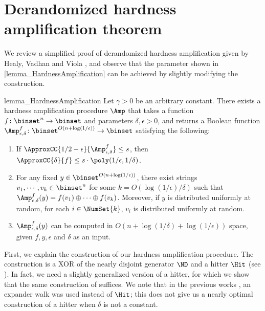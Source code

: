 \documentclass[11pt]{article}
\numberwithin{equation}{section}
\theoremstyle{definition}
\theoremstyle{plain}
\begin{document}
%
%
%
%
%
%
%
%
%
%
%
%
%
%
%
%
%
%
%
%
%
%
%
%
%
%
%
%
%
%
%
%
%
%
%
%

\appendix

\section{Derandomized hardness amplification theorem}
\label{section_HardnessAmplification}

We review a simplified proof of derandomized hardness amplification given by Healy, Vadhan and Viola \cite{HealyVV06_siamcomp_journals}, and observe that the parameter shown in \cref{lemma_HardnessAmplification} can be achieved by slightly modifying the construction.

\begin{theoremref}
  {lemma_HardnessAmplification}
  Let $\gamma > 0$ be an arbitrary constant.
  There exists a hardness amplification procedure $\Amp$
  that takes a function $f \colon \binset^n \to \binset$ and parameters $\delta, \epsilon > 0$,
  and returns
  a Boolean function
  $\Amp_{\epsilon, \delta}^f \colon \binset^{O(n + \log (1/\epsilon))} \to \binset$
  satisfying the following:
  \begin{enumerate}
    \item
          If $\ApproxCC{1/2 - \epsilon}{\Amp_{\epsilon, \delta}^f} \le s$,
          then
          $\ApproxCC{\delta}{f} \le s \cdot \poly(1/\epsilon, 1/\delta)$.
    \item
          For any fixed $y \in \binset^{O(n + \log (1 / \epsilon))}$,
          there exist strings $v_1, \cdots, v_k \in \binset^{n}$
          for some $k = O(\log (1 / \epsilon) / \delta)$
          such that
          $\Amp_{\epsilon, \delta}^f(y) =  f(v_1) \oplus \cdots \oplus f(v_k)$.
          Moreover, if $y$ is distributed uniformly at random,
          for each $i \in \NumSet{k}$,
          $v_i$ is distributed uniformly at random.
    \item
          $\Amp_{\epsilon, \delta}^f(y)$ can be computed in $O(n + \log (1 / \delta) + \log (1 / \epsilon))$ space,
          given $f, y, \epsilon$ and $\delta$ as an input.
  \end{enumerate}

\end{theoremref}


First, we explain the construction of our hardness amplification procedure.
The construction is
a XOR of the nearly disjoint generator $\ND$ and a hitter $\Hit$
%
(see \cite{Goldreich11j_goldreich2011_sp_books}). %
In fact, we need a slightly generalized version of a hitter, for which we show that the same construction of \cite{Goldreich11j_goldreich2011_sp_books} suffices.
We note that in the previous works \cite{ImpagliazzoW97_stoc_conf, HealyVV06_siamcomp_journals}, an expander walk was used instead of $\Hit$;
this does not give us a nearly optimal construction of a hitter when $\delta$ is not a constant. %
\end{document}
